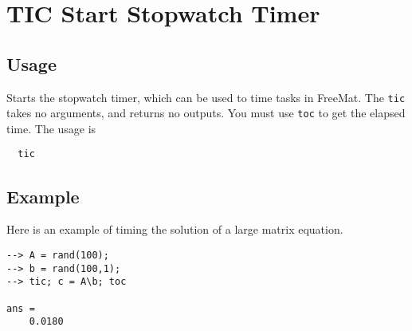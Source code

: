 \section{TIC Start Stopwatch Timer}

\subsection{Usage}

Starts the stopwatch timer, which can be used to time tasks in FreeMat.
The \verb|tic| takes no arguments, and returns no outputs.  You must use
\verb|toc| to get the elapsed time.  The usage is
\begin{verbatim}
  tic
\end{verbatim}
\subsection{Example}

Here is an example of timing the solution of a large matrix equation.
\begin{verbatim}
--> A = rand(100);
--> b = rand(100,1);
--> tic; c = A\b; toc

ans = 
    0.0180 
\end{verbatim}
